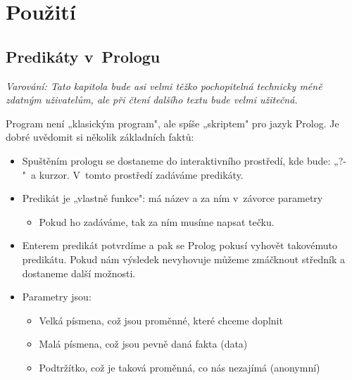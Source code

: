 \documentclass[a4paper]{article}
\begin{document}
\section{Použití}
\subsection{Predikáty v~Prologu}
\emph{Varování: Tato kapitola bude asi velmi těžko pochopitelná technicky méně zdatným uživatelům, ale při čtení dalšího textu bude velmi užitečná.}

Program není „klasickým program", ale spíše „skriptem" pro jazyk Prolog. Je dobré uvědomit si několik základních faktů:
\begin{itemize}
\item Spuštěním prologu se dostaneme do interaktivního prostředí, kde bude: „?- "~a kurzor. V~tomto prostředí zadáváme predikáty.
\item Predikát je „vlastně funkce": má název a za ním v~závorce parametry
\begin{itemize}
\item Pokud ho zadáváme, tak za ním musíme napsat tečku.
\end{itemize}
\item Enterem predikát potvrdíme a pak se Prolog pokusí vyhovět takovémuto predikátu. Pokud nám výsledek nevyhovuje můžeme zmáčknout středník a dostaneme další možnosti.
\item Parametry jsou:
\begin{itemize}
\item Velká písmena, což jsou proměnné, které chceme doplnit 
\item Malá písmena, což jsou pevně daná fakta (data)
\item Podtržítko, což je taková proměnná, co nás nezajímá (anonymní)
\end{itemize}
\end{itemize}
\end{document}
